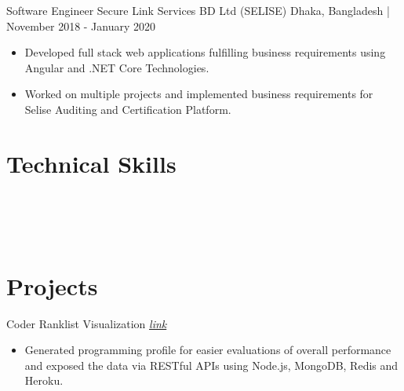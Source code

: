\documentclass{resumestyle}
\begin{document}
    \vspace{4pt}%


    \worksubsection%
        {Software Engineer}%
        {Secure Link Services BD Ltd (SELISE)}%
        {Dhaka, Bangladesh | November 2018 - January 2020}%
    
    \begin{itemize}[labelsep=4pt,leftmargin=*,topsep=5pt,partopsep=0pt,itemsep=1pt]%
        \item Developed full stack web applications fulfilling business requirements using Angular and .NET Core Technologies.%
        \item Worked on multiple projects and implemented business requirements for Selise Auditing and Certification Platform.%
    \end{itemize}%

    \vspace{0pt}%

\section{Technical Skills}%
\enspace%
\enspace%
\enspace%
\thinspace\thinspace%
\vspace{4pt}\\%
\enspace%
\enspace%
\enspace%
\enspace%
\vspace{4pt}\\%
\thinspace\thinspace%
\thinspace\thinspace%
\enspace%
\enspace%
\vspace{4pt}\\%
\thinspace\thinspace%
\thinspace\thinspace%
\thinspace\thinspace%
\thinspace\thinspace%
%


\section{Projects}%
    
    \projectsubsection%
        {Coder Ranklist}%
        {Visualization \hfill \textit{\href{https://www.lus.ac.bd/cp__trashed/ranklist/}{\textcolor{link}{link}}}}%
    \begin{itemize}[labelsep=4pt,leftmargin=*,topsep=5pt,partopsep=0pt,itemsep=1pt]%
        \item Generated programming profile for easier evaluations of overall performance and exposed the data via RESTful APIs using Node.js, MongoDB, Redis and Heroku.
    \end{itemize}%
\end{document}
